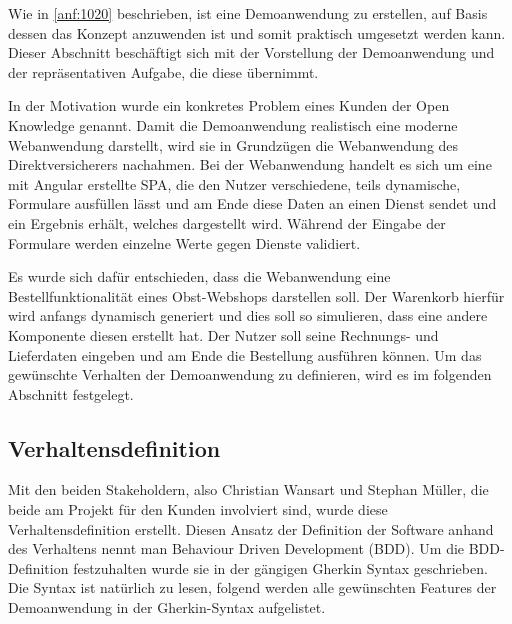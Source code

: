 
Wie in \autoref{anf:1020} beschrieben, ist eine Demoanwendung zu erstellen, auf Basis dessen das Konzept anzuwenden ist und somit praktisch umgesetzt werden kann. Dieser Abschnitt beschäftigt sich mit der Vorstellung der Demoanwendung und der repräsentativen Aufgabe, die diese übernimmt.

In der Motivation wurde ein konkretes Problem eines Kunden der Open Knowledge genannt. Damit die Demoanwendung realistisch eine moderne Webanwendung darstellt, wird sie in Grundzügen die Webanwendung des Direktversicherers nachahmen. Bei der Webanwendung handelt es sich um eine mit Angular erstellte SPA, die den Nutzer verschiedene, teils dynamische, Formulare ausfüllen lässt und am Ende diese Daten an einen Dienst sendet und ein Ergebnis erhält, welches dargestellt wird. Während der Eingabe der Formulare werden einzelne Werte gegen Dienste validiert.

Es wurde sich dafür entschieden, dass die Webanwendung eine Bestellfunktionalität eines Obst-Webshops darstellen soll. Der Warenkorb hierfür wird anfangs dynamisch generiert und dies soll so simulieren, dass eine andere Komponente diesen erstellt hat. Der Nutzer soll seine Rechnungs- und Lieferdaten eingeben und am Ende die Bestellung ausführen können. Um das gewünschte Verhalten der Demoanwendung zu definieren, wird es im folgenden Abschnitt festgelegt.

\subsection{Verhaltensdefinition}

Mit den beiden Stakeholdern, also Christian Wansart und Stephan Müller, die beide am Projekt für den Kunden involviert sind, wurde diese Verhaltensdefinition erstellt. Diesen Ansatz der Definition der Software anhand des Verhaltens nennt man Behaviour Driven Development (BDD). Um die BDD-Definition festzuhalten wurde sie in der gängigen Gherkin \cite{Gherkin} Syntax geschrieben. Die Syntax ist natürlich zu lesen, folgend werden alle gewünschten Features der Demoanwendung in der Gherkin-Syntax aufgelistet.

